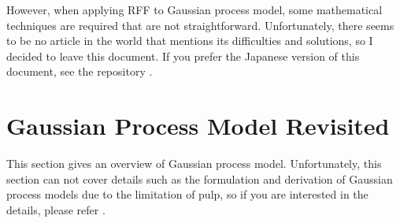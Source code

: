 \documentclass[twocolumn,a4paper,10pt]{article}
\begin{document}
However, when applying RFF to Gaussian process model, some mathematical techniques are required that
are not straightforward. Unfortunately, there seems to be no article in the world that mentions its
difficulties and solutions, so I decided to leave this document. If you prefer the Japanese version
of this document, see the repository \cite{Ishikawa2021}.


\section{Gaussian Process Model Revisited}\titlebar

This section gives an overview of Gaussian process model. Unfortunately, this section
can not cover details such as the formulation and derivation of Gaussian process models
due to the limitation of pulp, so if you are interested in the details,
please refer \cite{Rasmussen2006}.
\end{document}
